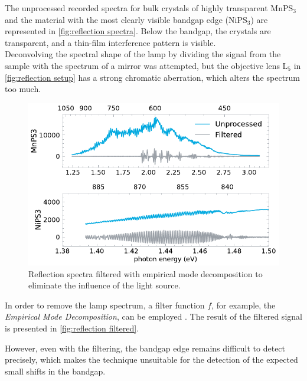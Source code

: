 \documentclass[
	twoside,
	parskip=half,
	a4paper,
]{scrbook}
\begin{document}
The unprocessed recorded spectra for bulk crystals of highly transparent MnPS$_3$ and the material with the most clearly visible bandgap edge (NiPS$_3$) are represented in \autoref{fig:reflection spectra}.
Below the bandgap, the crystals are transparent, and a thin-film interference pattern is visible.\\
Deconvolving the spectral shape of the lamp by dividing the signal from the sample with the spectrum of a mirror was attempted, but the objective lens L$_5$ in \autoref{fig:reflection setup} has a strong chromatic aberration, which alters the spectrum too much.
\begin{figure}
	\centering
	\includegraphics{../figures/2024-03-14 reflection spectra IMF.pdf}
	\caption{Reflection spectra filtered with empirical mode decomposition to eliminate the influence of the light source.}
	\label{fig:reflection filtered}
\end{figure}
In order to remove the lamp spectrum, a filter function $f$, for example, the \textit{Empirical Mode Decomposition}, can be employed \cite{thickness}.
The result of the filtered signal is presented in \autoref{fig:reflection filtered}.

However, even with the filtering, the bandgap edge remains difficult to detect precisely, which makes the technique unsuitable for the detection of the expected small shifts in the bandgap.
\end{document}
